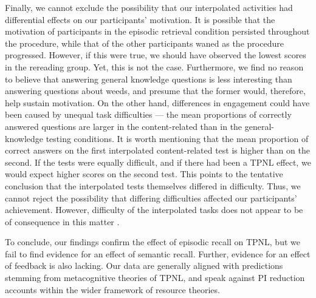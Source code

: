 \documentclass[../main.tex]{subfiles}
\begin{document}
Finally, we cannot exclude the possibility that our 
interpolated activities had differential effects on our 
participants’ motivation. It is possible that the 
motivation of participants in the episodic retrieval 
condition persisted throughout the procedure, while that of 
the other participants waned as the procedure progressed. 
However, if this were true, we should have observed 
the lowest scores in the rereading group. Yet, this is not 
the case. Furthermore, we find no reason to believe that 
answering general knowledge questions is less interesting 
than answering questions about weeds, and presume that the 
former would, therefore, help sustain motivation. On the 
other hand, differences in engagement could have been 
caused by unequal task difficulties — the mean proportions 
of correctly answered questions are larger in the 
content-related than in the general-knowledge testing 
conditions. It is worth mentioning that the mean proportion 
of correct answers on the first interpolated 
content-related test is higher than on the second. If the 
tests were equally difficult, and if there had been a TPNL 
effect, we would expect higher scores on the second test. 
This points to the tentative conclusion that the 
interpolated tests themselves differed in difficulty. Thus, 
we cannot reject the possibility that differing 
difficulties affected our participants’ achievement. 
However, difficulty of the interpolated tasks does not 
appear to be of consequence in this matter 
\citep{divisRetrievalSpeedsContext2014, 
pastotterRetrievalLearningFacilitates2011, 
sahakyanContextChangeRetrieval2012}.

To conclude, our findings confirm the effect of episodic 
recall on TPNL, but we fail to find evidence for an effect 
of semantic recall. Further, evidence for an effect of 
feedback is also lacking. Our data are generally aligned 
with predictions stemming from metacognitive theories of 
TPNL, and speak against PI reduction accounts within the 
wider framework of resource theories.
\end{document}

